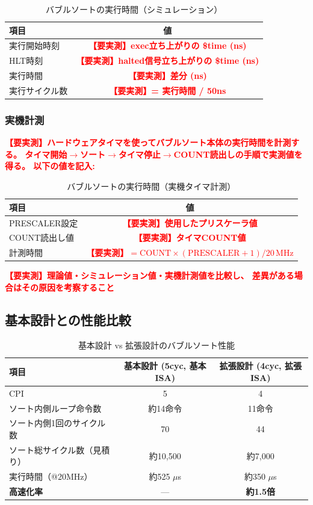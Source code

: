 \documentclass[a4paper,11pt]{ltjsarticle}
\newcommand{\measured}[1]{\textcolor{red}{\textbf{【要実測】#1}}}
\begin{document}
\begin{table}[h]
\centering
\caption{バブルソートの実行時間（シミュレーション）}
\begin{tabular}{lc}
\toprule
項目 & 値 \\
\midrule
実行開始時刻 & \measured{exec立ち上がりの \$time (ns)} \\
HLT時刻      & \measured{halted信号立ち上がりの \$time (ns)} \\
実行時間      & \measured{差分 (ns)} \\
実行サイクル数 & \measured{= 実行時間 / 50ns} \\
\bottomrule
\end{tabular}
\end{table}

\subsubsection{実機計測}

\measured{ハードウェアタイマを使ってバブルソート本体の実行時間を計測する。
タイマ開始$\to$ソート$\to$タイマ停止$\to$COUNT読出しの手順で実測値を得る。
以下の値を記入:}

\begin{table}[h]
\centering
\caption{バブルソートの実行時間（実機タイマ計測）}
\begin{tabular}{lc}
\toprule
項目 & 値 \\
\midrule
PRESCALER設定 & \measured{使用したプリスケーラ値} \\
COUNT読出し値 & \measured{タイマCOUNT値} \\
計測時間 & \measured{$= \mathrm{COUNT} \times (\mathrm{PRESCALER}+1) / 20\,\mathrm{MHz}$} \\
\bottomrule
\end{tabular}
\end{table}

\measured{理論値・シミュレーション値・実機計測値を比較し、
差異がある場合はその原因を考察すること}

\subsection{基本設計との性能比較}

\begin{table}[h]
\centering
\caption{基本設計 vs 拡張設計のバブルソート性能}
\begin{tabular}{lcc}
\toprule
項目 & 基本設計 (5cyc, 基本ISA) & 拡張設計 (4cyc, 拡張ISA) \\
\midrule
CPI & 5 & 4 \\
ソート内側ループ命令数 & 約14命令 & 11命令 \\
ソート内側1回のサイクル数 & 70 & 44 \\
ソート総サイクル数（見積り）& 約10,500 & 約7,000 \\
実行時間（@20MHz） & 約525 $\mu$s & 約350 $\mu$s \\
\textbf{高速化率} & --- & \textbf{約1.5倍} \\
\bottomrule
\end{tabular}
\end{table}
\end{document}
